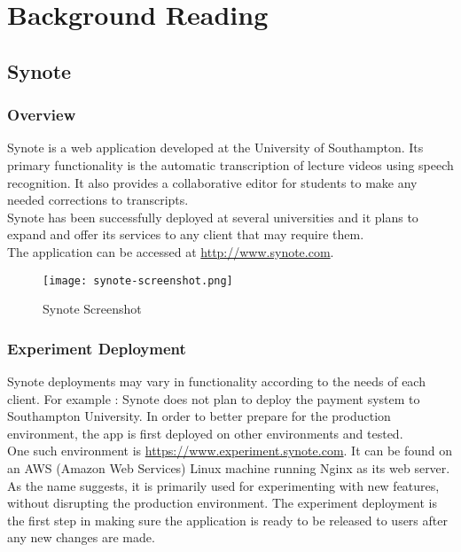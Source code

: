 \chapter{Background Reading}
\label{chap:background-reading}

\section{Synote}
\label{sec:synote}

\subsection{Overview}
\label{subsec:quick-overview}
Synote is a web application developed at the University of Southampton. Its primary functionality is the automatic transcription of lecture videos using speech recognition. It also provides a collaborative editor for students to make any needed corrections to transcripts. \\

Synote has been successfully deployed at several universities and it plans to expand and offer its services to any client that may require them. \\

The application can be accessed at \url{http://www.synote.com}. \\

\begin{figure}[!hbt]
  \centering
 	\texttt{[image: synote-screenshot.png]}
  \caption{Synote Screenshot}
 	\label{fig:synote-screenshot}
\end{figure}

\subsection{Experiment Deployment}
\label{subsec:experiment-deployment}

Synote deployments may vary in functionality according to the needs of each client. For example : Synote does not plan to deploy the payment system to Southampton University. In order to better prepare for the production environment, the app is first deployed on other environments and tested. \\

One such environment is \url{https://www.experiment.synote.com}. It can be found on an AWS (Amazon Web Services) Linux machine running Nginx as its web server. As the name suggests, it is primarily used for experimenting with new features, without disrupting the production environment. The experiment deployment is the first step in making sure the application is ready to be released to users after any new changes are made. \\

